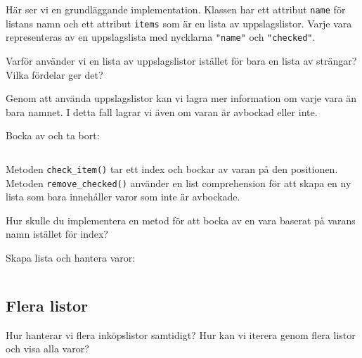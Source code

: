 Här ser vi en grundläggande implementation. Klassen har ett attribut 
\texttt{name} för listans namn och ett attribut 
\texttt{items} som är en lista av uppslagslistor. Varje vara 
representeras av en uppslagslista med nycklarna \texttt{"name"} 
och \texttt{"checked"}.

\begin{exercise}
  Varför använder vi en lista av uppslagslistor istället för bara en lista 
  av strängar? Vilka fördelar ger det?
\end{exercise}

Genom att använda uppslagslistor kan vi lagra mer information om varje vara 
än bara namnet. I detta fall lagrar vi även om varan är avbockad eller inte.

\begin{frame}[fragile]
  \begin{example}
    Bocka av och ta bort:
    \inputminted[linenos,firstline=16,lastline=22]{python}{examples/shopping.py}
  \end{example}
\end{frame}

Metoden \texttt{check_item()} tar ett index och bockar av varan 
på den positionen. Metoden \texttt{remove_checked()} använder en 
list comprehension för att skapa en ny lista som bara innehåller varor som 
inte är avbockade.

\begin{exercise}
  Hur skulle du implementera en metod för att bocka av en vara baserat på 
  varans namn istället för index?
\end{exercise}

\begin{frame}[fragile]
  \begin{example}
    Skapa lista och hantera varor:
    \inputminted[linenos,firstline=24,lastline=37]{python}{examples/shopping.py}
  \end{example}
\end{frame}

\subsection{Flera listor}

\begin{exercise}
  Hur hanterar vi flera inköpslistor samtidigt?
  Hur kan vi iterera genom flera listor och visa alla varor?
\end{exercise}

